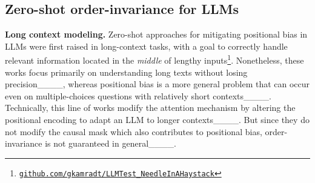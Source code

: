 \begin{comment}
\subsection{Parallel Context Processing}
Among several works that propose to modify model architectures, PCW____ was the first(?todo: check) that propose parallel context window for decoder-only models but recent works point out that interaction between passages are limited that it works merely the same as weighted sum ensemble of giving individual rows and summing up responses____.
____ introduce an additional overhead to train the encoder model from scratch, which gets very dependent on the training data for the encoder and also doesn't \sw{does not} generalize to windows that exceed the context length (256 per encoder). Also, the model doesn't have space to process sequential text. (No prefix or suffix) \sw{this section is too casually written} %
____ further goes on to eliminate the bias arising from causal attention by rearranging the positional bias to behave in an invariant way and further improves on parallel text processing, but they are unstable to similar contexts that leads to same KV attention similarity value and it still doesn't generalize well to tasks with larger window size. 
Of all the above previous works, no method has ever tackled the problem of enhancing the sequential AND parallel processing ability together. %

____ conducted parallel runs of LLMs with different RoPE angles, thereby mitigating the risk of overlooking crucial information through a weighted sum of the outputs. These approaches usually require additional memory or multiple inference runs, which can be expensive for LLMs.  


\end{comment}

\subsection{Zero-shot order-invariance for LLMs}
\label{related_work:orderinv}
\textbf{Long context modeling.} Zero-shot approaches for mitigating positional bias in LLMs were first raised in long-context tasks, with a goal to correctly handle relevant information located in the \textit{middle} of lengthy inputs\footnote{\href{https://github.com/gkamradt/LLMTest_NeedleInAHaystack}{\texttt{github.com/gkamradt/LLMTest\_NeedleInAHaystack}}}. Nonetheless, these works focus primarily on understanding long texts without losing precision____, whereas positional bias is a more general problem that can occur even on multiple-choices questions with relatively short contexts____. Technically, this line of works modify the attention mechanism by altering the positional encoding to adapt an LLM to longer contexts____. But since they do not modify the causal mask which also contributes to positional bias, order-invariance is not guaranteed in general____.


